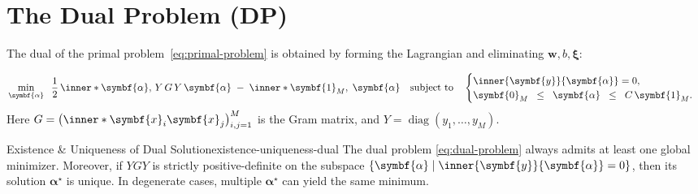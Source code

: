 \section{The Dual Problem (DP)}

The dual of the primal problem~\eqref{eq:primal-problem} is obtained by forming the Lagrangian and eliminating $\symbf{w},b,\symbf{\xi}$:

\begin{align}\label{eq:dual-problem}
	\min_{\symbf{\alpha}} 
	\;\;\frac{1}{2}\,\inner*{\symbf{\alpha},\,Y\,G\,Y\,\symbf{\alpha}} 
	\;-\;\inner*{\symbf{1}_M,\;\symbf{\alpha}}
	\quad
	\text{subject to}
	\quad
	\begin{cases}
		\inner{\symbf{y}}{\symbf{\alpha}} = 0,\\
		\symbf{0}_M \;\;\leq\;\; \symbf{\alpha} \;\;\leq\;\; C\,\symbf{1}_M.
	\end{cases}
\end{align}
Here $G = \bigl(\inner*{\symbf{x}_i}{\symbf{x}_j}\bigr)_{i,j=1}^M$ is the Gram matrix, and $Y=\operatorname{diag}(y_1,\dots,y_M)$.

\begin{theorem}{Existence \& Uniqueness of Dual Solution}{existence-uniqueness-dual}
The dual problem \eqref{eq:dual-problem} always admits at least one global minimizer. Moreover, if $YGY$ is strictly positive-definite on the subspace $\{\symbf{\alpha}\mid \inner{\symbf{y}}{\symbf{\alpha}}=0\}$, then its solution $\symbf{\alpha}^\star$ is unique. In degenerate cases, multiple $\symbf{\alpha}^\star$ can yield the same minimum.
\end{theorem}

